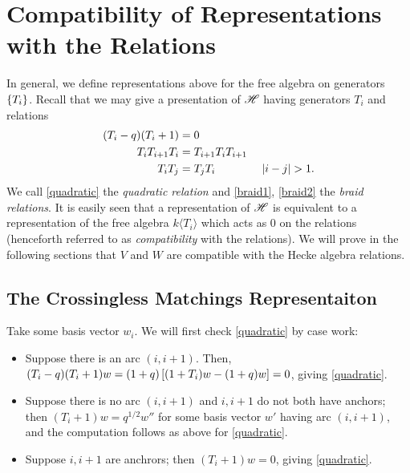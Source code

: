 \documentclass{amsart}
\begin{document}
\section{Compatibility of Representations with the Relations}
In general, we define representations above for the free algebra on generators $\left\{ T_i \right\}$.
Recall that we may give a presentation of $\mathscr{H}$ having generators $T_i$ and relations
\begin{align}
  (T_i - q)(T_i + 1) &= 0 \label{quadratic}\\
  T_iT_{i+1}T_i &= T_{i+1}T_iT_{i+1} \label{braid1}\\ 
  T_iT_j &= T_jT_i \hspace{40pt} \left| i - j \right| > 1. \label{braid2}
\end{align}
We call \eqref{quadratic} the \emph{quadratic relation} and \eqref{braid1}, \eqref{braid2} the \emph{braid relations}.
It is easily seen that a representation of $\mathscr{H}$ is equivalent to a representation of the free algebra $k\langle T_i \rangle$ which acts as 0 on the relations (henceforth referred to as \emph{compatibility} with the relations).
We will prove in the following sections that $V$ and $W$ are compatible with the Hecke algebra relations.

\subsection{The Crossingless Matchings Representaiton}
\label{Cross Relations}
Take some basis vector $w_i$.
We will first check \eqref{quadratic} by case work:
\begin{itemize}
  \item Suppose there is an arc $(i,i+1)$.
    Then, $(T_i-q)(T_i + 1)w = (1 + q)\left[ (1 + T_i)w - (1 + q)w \right] = 0$, giving \eqref{quadratic}.

 
  \item Suppose there is no arc $(i,i+1)$ and $i,i+1$ do not both have anchors;
    then $(T_i +  1)w = q^{1/2}w''$ for some basis vector $w'$ having arc $(i,i+1)$, and the computation follows as above for \eqref{quadratic}.
  \item Suppose $i,i+1$ are anchrors;
    then $(T_i + 1)w = 0$, giving \eqref{quadratic}.
\end{itemize}
   
\end{document}
